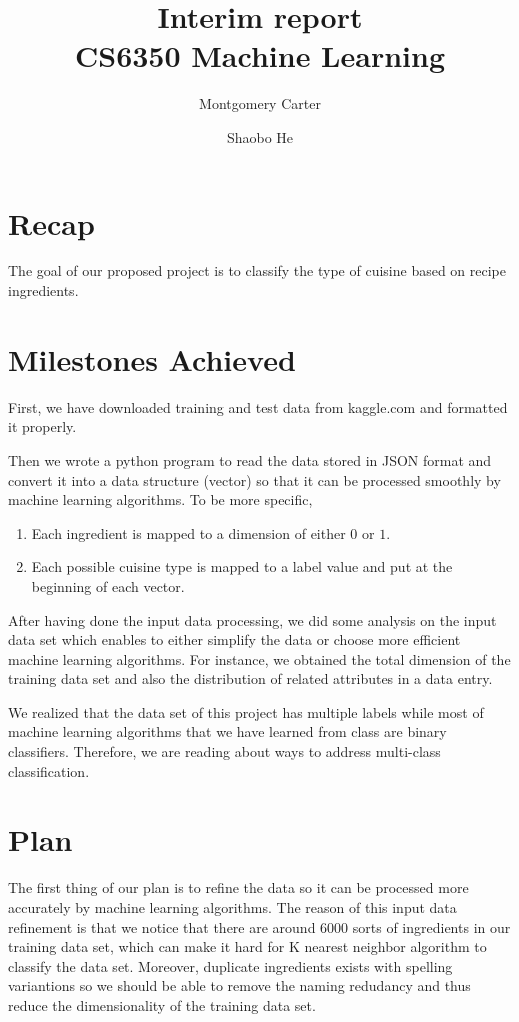 \documentclass[11pt]{article}
\title{Interim report\\CS6350 Machine Learning}
\author{Montgomery Carter \and Shaobo He}
\begin{document}
\maketitle

\section{Recap}
The goal of our proposed project is to classify the type of cuisine based on recipe ingredients\cite{kaggle-link}.
\section{Milestones Achieved}
\label{sec:background}
First, we have downloaded training and test data\cite{download-link} from kaggle.com and formatted it properly.

Then we wrote a python program to read the data stored in JSON format and convert it into a data structure (vector)
so that it can be processed smoothly by machine learning algorithms. To be more specific,
	\begin{enumerate}
		\item Each ingredient is mapped to a dimension of either $0$ or $1$.
		\item Each possible cuisine type is mapped to a label value and put at the beginning of each vector.
	\end{enumerate}

After having done the input data processing, we did some analysis on the input data set which enables to either simplify the data or choose more efficient machine learning algorithms. For instance, we obtained the total dimension of the training data set and also the distribution of related attributes in a data entry. 

We realized that the data set of this project has multiple labels while most of machine learning algorithms that we have learned from class are binary classifiers. Therefore, we are reading about ways to address multi-class classification.\cite{wiki}


\section{Plan}
\label{sec:plan}

The first thing of our plan is to refine the data so it can be processed more accurately by machine learning algorithms. The reason of this input data refinement is that
we notice that there are around $6000$ sorts of ingredients in our training data set, which can make it hard for K nearest neighbor algorithm to classify the data set.
Moreover, duplicate ingredients exists with spelling variantions so we should be able to remove the naming redudancy and thus reduce the dimensionality of the training data set.
\end{document}
